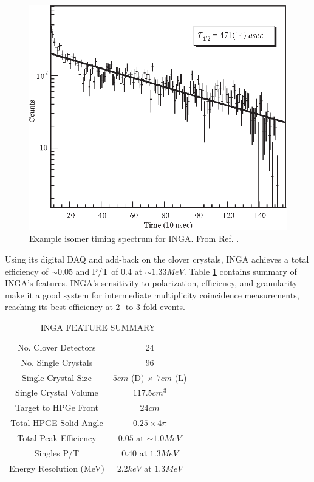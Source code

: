 \begin{figure}[h!]
	\centerline{\includegraphics[height=0.35\textheight]{./img/c3/INGA_isomer.eps}}
	\caption{Example isomer timing spectrum for INGA. From Ref. \cite{IngaDigitalDAQ}.}
	\label{fig:chp3-INGA-isomer}
\end{figure}

Using its digital DAQ and add-back on the clover crystals, INGA achieves a total efficiency of $\sim0.05$ and P/T of $0.4$ at $\sim1.33MeV$. Table \ref{tbl:inga-summary} contains summary of INGA's features. INGA's sensitivity to polarization, efficiency, and granularity make it a good system for intermediate \gr{} multiplicity coincidence measurements, reaching its best efficiency at 2- to 3-fold events.

\begin{table}[ht!]
\caption{INGA FEATURE SUMMARY\label{tbl:inga-summary}}
\begin{center}
\begin{tabular}{|c|c|}
\hline
\hline
No. Clover Detectors      & 24\\ 
No. Single Crystals       & 96\\ 
Single Crystal Size       & $5 cm$ (D) $\times$ $7 cm$ (L) \\
Single Crystal Volume     & $117.5 cm^3$\\
Target to HPGe Front      & $24 cm$\\ 
Total HPGE Solid Angle    & $0.25 \times 4\pi$\\ 
Total Peak Efficiency     & $0.05$ at $\sim1.0 MeV$\\ 
Singles P/T               & $0.40$ at $1.3 MeV$ \\ 
Energy Resolution (MeV)   & $2.2keV$ at $1.3 MeV$ \\ 
\hline 
\hline 
\end{tabular}
\end{center}
\end{table}

